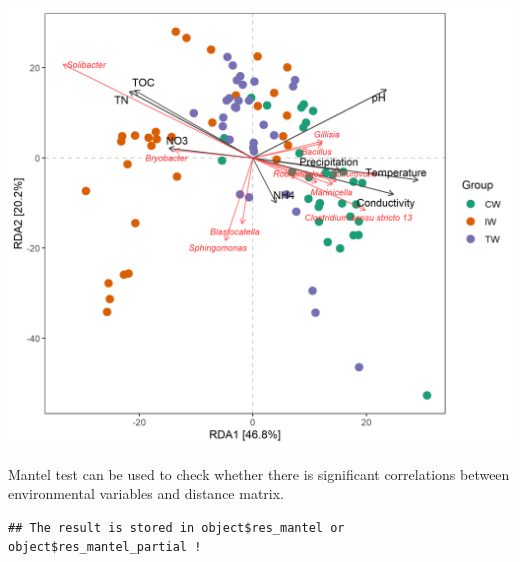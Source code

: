 \documentclass[
]{book}
\newenvironment{Shaded}{\begin{snugshade}}{\end{snugshade}}
\newcommand{\AttributeTok}[1]{\textcolor[rgb]{0.77,0.63,0.00}{#1}}
\newcommand{\CommentTok}[1]{\textcolor[rgb]{0.56,0.35,0.01}{\textit{#1}}}
\newcommand{\FunctionTok}[1]{\textcolor[rgb]{0.00,0.00,0.00}{#1}}
\newcommand{\NormalTok}[1]{#1}
\newcommand{\SpecialCharTok}[1]{\textcolor[rgb]{0.00,0.00,0.00}{#1}}
\newcommand{\StringTok}[1]{\textcolor[rgb]{0.31,0.60,0.02}{#1}}
\begin{document}
\begin{center}\includegraphics[width=650px]{Images/plot_rda_genus} \end{center}

Mantel test can be used to check whether there is significant correlations between environmental variables and distance matrix.

\begin{Shaded}
\end{Shaded}

\begin{verbatim}
## The result is stored in object$res_mantel or object$res_mantel_partial !
\end{verbatim}
\end{document}
